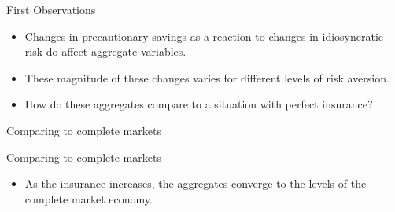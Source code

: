 \documentclass{beamer}
\begin{document}
\begin{frame}{First Observations}
	\begin{itemize}
	
	\item {
	Changes in precautionary savings as a reaction to changes in idiosyncratic risk do affect aggregate variables.
	}

	\item {
	These magnitude of these changes varies for different levels of risk aversion.
	}
	
		\item {
	How do these aggregates compare to a situation with perfect insurance? 
	}

	\end{itemize}
	
\end{frame}
	

\begin{frame}{Comparing to complete markets}

\end{frame}
	
		
\begin{frame}{Comparing to complete markets}
	\begin{itemize}
	
	\item {
	As the insurance increases, the aggregates converge to the levels of the complete market economy. 
	}


	\end{itemize} 
\end{frame}
	
\end{document}
